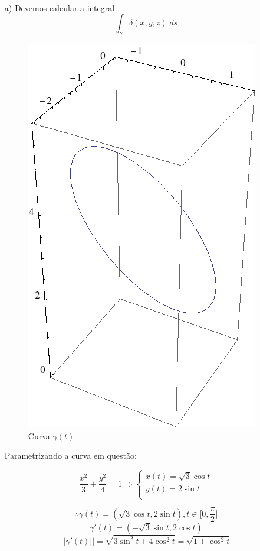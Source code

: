 \documentclass[12pt,a4paper]{article}
\begin{document}
 \\

\begin{itemize}
\item[a)]
Devemos calcular a integral
$$  \int_{\gamma}{\delta(x,y,z)}\;ds $$

\begin{figure}[h!]
	\centering
	\includegraphics[scale=0.2]{Fig3.png}  
	\caption{Curva $\gamma(t)$}
	\label{fig:figura3}
\end{figure}

Parametrizando a curva em questão:

$$
\frac{x^2}{3} + \frac{y^2}{4} = 1
\Rightarrow
\begin{cases}
x(t) = \sqrt{3}\cos t \\
y(t) = 2\sin t\\
\end{cases}
$$

$$ \therefore \gamma(t) = (\sqrt{3}\cos t, 2\sin t), t \in \Big[0,\frac{\pi}{2}\Big] $$
$$ \gamma'(t) = (-\sqrt{3}\sin t, 2\cos t) $$
$$ ||\gamma'(t)|| = \sqrt{3\sin^2 t + 4\cos^2 t} = \sqrt{1 + \cos^2 t} $$


\end{itemize}
\end{document}
